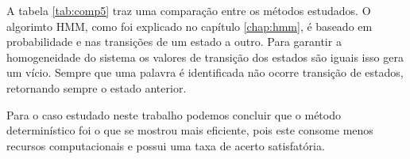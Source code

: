 A tabela \ref{tab:comp5} traz uma comparação entre os métodos estudados. O algorimto HMM, como foi explicado no capítulo \ref{chap:hmm}, é baseado em probabilidade e nas transições de um estado a outro. Para garantir a homogeneidade do sistema
os valores de transição dos estados são iguais isso gera um vício. Sempre que uma palavra é identificada não ocorre transição de estados, retornando sempre o estado anterior.

Para o caso estudado neste trabalho podemos concluir que o  método determinístico foi o que se mostrou mais eficiente, pois este consome menos recursos computacionais e possui uma taxa de acerto satisfatória.















































 

